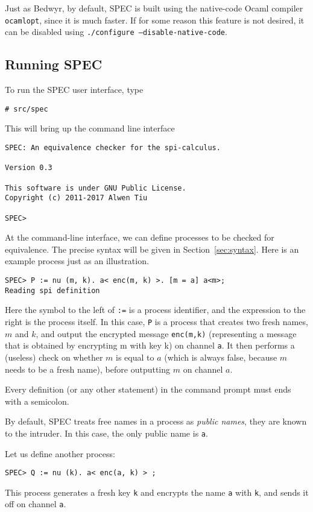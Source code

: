 \documentclass{article}
\begin{document}
Just as Bedwyr, by default, SPEC is built using the native-code Ocaml compiler \texttt{ocamlopt},
since it is much faster. If for some reason this feature is not desired, it can
be disabled using \texttt{./configure --disable-native-code}.

\subsection{Running SPEC}

To run the SPEC user interface, type
\begin{verbatim}
# src/spec
\end{verbatim}
This will bring up the command line interface
\begin{verbatim}
SPEC: An equivalence checker for the spi-calculus. 

Version 0.3

This software is under GNU Public License.
Copyright (c) 2011-2017 Alwen Tiu

SPEC> 

\end{verbatim}
At the command-line interface, we can define processes to be checked for equivalence.
The precise syntax will be given in Section~\ref{sec:syntax}. Here is an example process
just as an illustration. 

\begin{verbatim}
SPEC> P := nu (m, k). a< enc(m, k) >. [m = a] a<m>;
Reading spi definition
\end{verbatim}
Here the symbol to the left of \texttt{:=} is a process identifier, and 
the expression to the right is the process itself. In this case, \texttt{P}
is a process that creates two fresh names, $m$ and $k$, and output 
the encrypted message \texttt{enc(m,k)} (representing a message that is obtained
by encrypting m with key k) on channel \texttt{a}.
It then performs a (useless) check on whether $m$ is equal to $a$ 
(which is always false, because $m$ needs to be a fresh name), before outputting $m$ on channel $a$. 

Every definition (or any other statement) in the command prompt must ends with a
semicolon.

By default, SPEC treats free names in a process as {\em public names}, they are known
to the intruder. In this case, the only public name is \texttt{a}. 

Let us define another process:

\begin{verbatim}
SPEC> Q := nu (k). a< enc(a, k) > ;
\end{verbatim}
This process generates a fresh key \texttt{k} and encrypts the name \texttt{a}
with \texttt{k}, and sends it off on channel \texttt{a}. 
\end{document}
